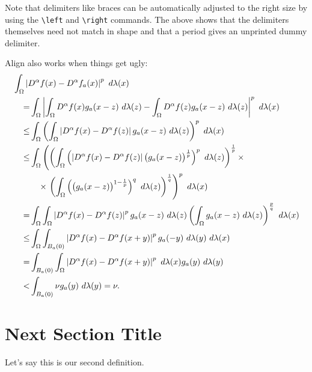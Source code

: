Note that delimiters like braces can be automatically adjusted to the right size
by using the \verb+\left+ and \verb+\right+ commands.
The above shows that the delimiters themselves need not match in shape and
that a period gives an unprinted dummy delimiter.




Align also works when things get ugly:
\begin{align*}
\MoveEqLeft
\int _{\Omega
} \left|
D^\alpha f(x)
-D^\alpha f_a (x)\right| ^p
\ d\lambda (x)
\\
= &
\int _{\Omega
}
\left| \int _\Omega D^\alpha f(x) g_a (x-z) \ d\lambda (z)-
\int _\Omega D^\alpha f (z) g_a (x-z)  \ d\lambda (z)
\right| ^p
\ d\lambda (x)
\\
\leq &
\int _\Omega \left(
\int _\Omega \left| D^\alpha f(x)-D^\alpha f (z) \right|
g_a (x-z)  \ d\lambda (z)
\right) ^p
\ d\lambda (x)
\\
\leq &
\int _\Omega \left(
\left(
\int _\Omega \left( \left| D^\alpha f(x)-D^\alpha f (z) \right|
\big( g_a (x-z)\big) ^{1\over p}  \right) ^p \ d\lambda (z)
\right) ^{1\over p}
\times \right.
\\
&
\quad
\times
\left.
\left(
\int _\Omega
\left(
\big( g_a (x-z)\big) ^{1-{1\over p}}  \right) ^q \ d\lambda (z)
\right) ^{1\over q}
\right) ^p
\ d\lambda (x)
\\
= &
\int _\Omega
\int _\Omega \left| D^\alpha f(x)-D^\alpha f (z) \right| ^p
g_a (x-z) \ d\lambda (z)
\left(
\int _\Omega
g_a (x-z)   \ d\lambda (z)
\right) ^{p\over q}
\ d\lambda (x)
\\
\leq &
\int _\Omega
\int _{B_a (0)} \left| D^\alpha f(x)-D^\alpha f (x+y) \right| ^p
g_a (-y) \ d\lambda (y)
\ d\lambda (x)
\\
= &
\int _{B_a (0)}
\int _\Omega
\left| D^\alpha f(x)-D^\alpha f (x+y) \right| ^p
\ d\lambda (x)
g_a (y) \ d\lambda (y)
\\
< &
\int _{B_a (0)}
\nu
g_a (y) \ d\lambda (y)
=\nu .
\end{align*}





\section{Next Section Title}



\begin{definition}
\label{def2}

Let's say this is our second definition.

\end{definition}


